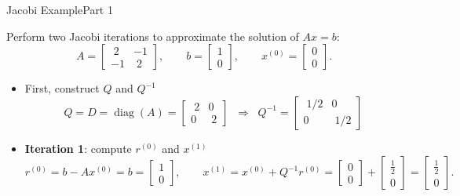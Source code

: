 \documentclass[10pt]{beamer}
\begin{document}
\begin{frame}{Jacobi Example}{Part 1}

\begin{example}
Perform two Jacobi iterations to approximate the solution of \(Ax=b\):
\[
A=\begin{bmatrix}
\;2 & -1\\
-1 & \;2
\end{bmatrix},
\qquad
b=\begin{bmatrix}
1\\[2pt] 0
\end{bmatrix},
\qquad
x^{(0)}=\begin{bmatrix}
0\\[2pt] 0
\end{bmatrix}.
\]
\end{example}

\begin{itemize}
    \item First, construct $Q$ and $Q^{-1}$
\[
Q=D=\operatorname{diag}(A)=
\begin{bmatrix}
\;2 & 0\\
0 & \;2
\end{bmatrix}
\;\;\Longrightarrow\;\;
Q^{-1}=
\begin{bmatrix}
\;1/2 & 0\\
0 & \;1/2
\end{bmatrix}
\]
\item \textbf{Iteration 1}: compute $r^{(0)}$ and $x^{(1)}$
\[
r^{(0)} = b-Ax^{(0)} = b =
\begin{bmatrix}1\\ 0\end{bmatrix},\qquad
x^{(1)} = x^{(0)} + Q^{-1}r^{(0)} =
\begin{bmatrix}0\\ 0\end{bmatrix} +
\begin{bmatrix}\tfrac12\\ 0\end{bmatrix} =
\begin{bmatrix}\tfrac12\\ 0\end{bmatrix}.
\]
\end{itemize}

\end{frame}
\end{document}
